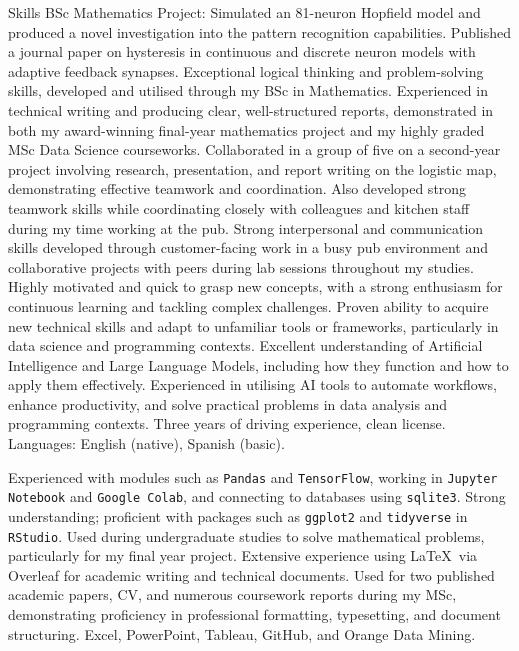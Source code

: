 
\begin{rubric}{Skills}
	BSc Mathematics Project: Simulated an 81-neuron Hopfield model and produced a novel investigation into the pattern recognition capabilities. \vspace{0.2cm} \newline
    Published a journal paper on hysteresis in continuous and discrete neuron models with adaptive feedback synapses. 
	Exceptional logical thinking and problem-solving skills, developed and utilised through my BSc in Mathematics. Experienced in technical writing and producing clear, well-structured reports, demonstrated in both my award-winning final-year mathematics project and my highly graded MSc Data Science courseworks.
        Collaborated in a group of five on a second-year project involving research, presentation, and report writing on the logistic map, demonstrating effective teamwork and coordination. Also developed strong teamwork skills while coordinating closely with colleagues and kitchen staff during my time working at the pub.
        Strong interpersonal and communication skills developed through customer-facing work in a busy pub environment and collaborative projects with peers during lab sessions throughout my studies.
Highly motivated and quick to grasp new concepts, with a strong enthusiasm for continuous learning and tackling complex challenges. Proven ability to acquire new technical skills and adapt to unfamiliar tools or frameworks, particularly in data science and programming contexts.
\entry*[AI\hfill]
Excellent understanding of Artificial Intelligence and Large Language Models, including how they function and how to apply them effectively. Experienced in utilising AI tools to automate workflows, enhance productivity, and solve practical problems in data analysis and programming contexts.
\entry*[Other]
	Three years of driving experience, clean license. Languages: English (native), Spanish (basic).
    

	Experienced with modules such as \texttt{Pandas} and \texttt{TensorFlow}, working in \texttt{Jupyter Notebook} and \texttt{Google Colab}, and connecting to databases using \texttt{sqlite3}.
\entry*[R\hfill]
	Strong understanding; proficient with packages such as \texttt{ggplot2} and \texttt{tidyverse} in \texttt{RStudio}.
	Used during undergraduate studies to solve mathematical problems, particularly for my final year project.
\entry*[\LaTeX\hfill]
Extensive experience using \LaTeX\ via Overleaf for academic writing and technical documents. Used for two published academic papers, CV, and numerous coursework reports during my MSc, demonstrating proficiency in professional formatting, typesetting, and document structuring.
        Excel, PowerPoint, Tableau, GitHub, and Orange Data Mining.
\end{rubric}
